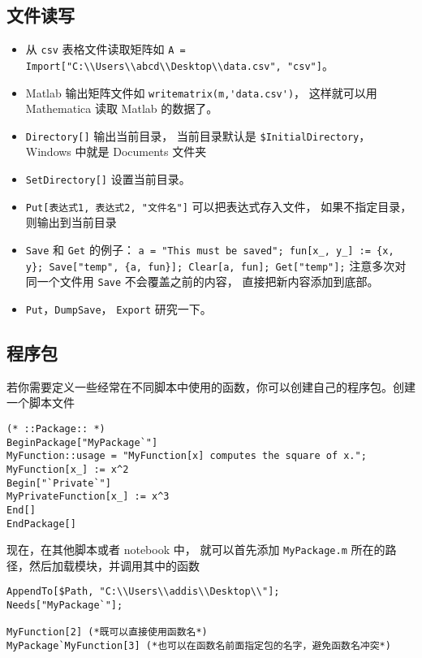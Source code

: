 \subsection{文件读写}
\begin{itemize}
\item 从 \verb|csv| 表格文件读取矩阵如 \verb|A = Import["C:\\Users\\abcd\\Desktop\\data.csv", "csv"]|。
\item Matlab 输出矩阵文件如 \verb|writematrix(m,'data.csv')|， 这样就可以用 Mathematica 读取 Matlab 的数据了。
\item \verb|Directory[]| 输出当前目录， 当前目录默认是 \verb|$InitialDirectory|， Windows 中就是 Documents 文件夹
\item \verb|SetDirectory[]| 设置当前目录。
\item \verb|Put[表达式1, 表达式2, "文件名"]| 可以把表达式存入文件， 如果不指定目录， 则输出到当前目录
\item \verb|Save| 和 \verb|Get| 的例子： \verb|a = "This must be saved"; fun[x_, y_] := {x, y}; Save["temp", {a, fun}]; Clear[a, fun]; Get["temp"];| 注意多次对同一个文件用 \verb|Save| 不会覆盖之前的内容， 直接把新内容添加到底部。
\item \verb|Put|，\verb|DumpSave|， \verb|Export| 研究一下。
\end{itemize}

\subsection{程序包}
若你需要定义一些经常在不同脚本中使用的函数，你可以创建自己的程序包。创建一个脚本文件
\begin{lstlisting}[language=mma,caption=MyPackage.m]
(* ::Package:: *)
BeginPackage["MyPackage`"]
MyFunction::usage = "MyFunction[x] computes the square of x.";
MyFunction[x_] := x^2
Begin["`Private`"]
MyPrivateFunction[x_] := x^3
End[]
EndPackage[]
\end{lstlisting}
现在，在其他脚本或者 notebook 中， 就可以首先添加 \verb|MyPackage.m| 所在的路径，然后加载模块，并调用其中的函数
\begin{lstlisting}[language=mma]
AppendTo[$Path, "C:\\Users\\addis\\Desktop\\"];
Needs["MyPackage`"];

MyFunction[2] (*既可以直接使用函数名*)
MyPackage`MyFunction[3] (*也可以在函数名前面指定包的名字，避免函数名冲突*)
\end{lstlisting}

